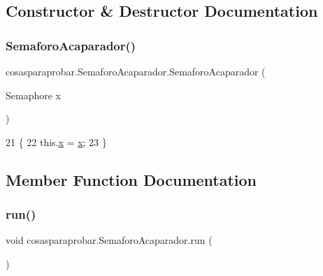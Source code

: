\subsection{Constructor \& Destructor Documentation}
\mbox{\label{classcosasparaprobar_1_1_semaforo_acaparador_a8ce5bf41c9493ee9cef15fe9111322ad}} 
\subsubsection{\texorpdfstring{Semaforo\+Acaparador()}{SemaforoAcaparador()}}
{\footnotesize\ttfamily cosasparaprobar.\+Semaforo\+Acaparador.\+Semaforo\+Acaparador (\begin{DoxyParamCaption}\item[{Semaphore}]{x }\end{DoxyParamCaption})\hspace{0.3cm}{\ttfamily [inline]}}


\begin{DoxyCode}
21     \{
22         this.\mbox{\hyperlink{classcosasparaprobar_1_1_semaforo_acaparador_a20c0bcd988d575bb629fe6aa1c2a1a72}{x}} = \mbox{\hyperlink{classcosasparaprobar_1_1_semaforo_acaparador_a20c0bcd988d575bb629fe6aa1c2a1a72}{x}};
23     \}
\end{DoxyCode}


\subsection{Member Function Documentation}
\mbox{\label{classcosasparaprobar_1_1_semaforo_acaparador_aa13f77e80627c950231494ec075ac2fc}} 
\subsubsection{\texorpdfstring{run()}{run()}}
{\footnotesize\ttfamily void cosasparaprobar.\+Semaforo\+Acaparador.\+run (\begin{DoxyParamCaption}{ }\end{DoxyParamCaption})\hspace{0.3cm}{\ttfamily [inline]}}


